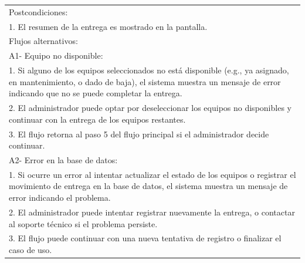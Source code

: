 \documentclass[stu, 12pt, letterpaper, donotrepeattitle, floatsintext, natbib]{apa7}
\begin{document}
\begin{longtable}{@{} p{16.5cm} @{}}
    Postcondiciones:                                                                                                                                                                                                       \\
    1. El resumen de la entrega es mostrado en la pantalla.                                                                                                                                                                \\ \midrule
    Flujos alternativos:                                                                                                                                                                                                   \\
    A1- Equipo no disponible:                                                                                                                                                                                              \\
    \hspace{1cm}1. Si alguno de los equipos seleccionados no está disponible (e.g., ya asignado, en mantenimiento, o dado de baja), el sistema muestra un mensaje de error indicando que no se puede completar la entrega. \\
    \hspace{1cm}2. El administrador puede optar por deseleccionar los equipos no disponibles y continuar con la entrega de los equipos restantes.                                                                          \\
    \hspace{1cm}3. El flujo retorna al paso 5 del flujo principal si el administrador decide continuar.                                                                                                                    \\
    A2- Error en la base de datos:                                                                                                                                                                                         \\
    \hspace{1cm}1. Si ocurre un error al intentar actualizar el estado de los equipos o registrar el movimiento de entrega en la base de datos, el sistema muestra un mensaje de error indicando el problema.              \\
    \hspace{1cm}2. El administrador puede intentar registrar nuevamente la entrega, o contactar al soporte técnico si el problema persiste.                                                                                \\
    \hspace{1cm}3. El flujo puede continuar con una nueva tentativa de registro o finalizar el caso de uso.                                                                                                                \\ \bottomrule
\end{longtable}
\end{document}
